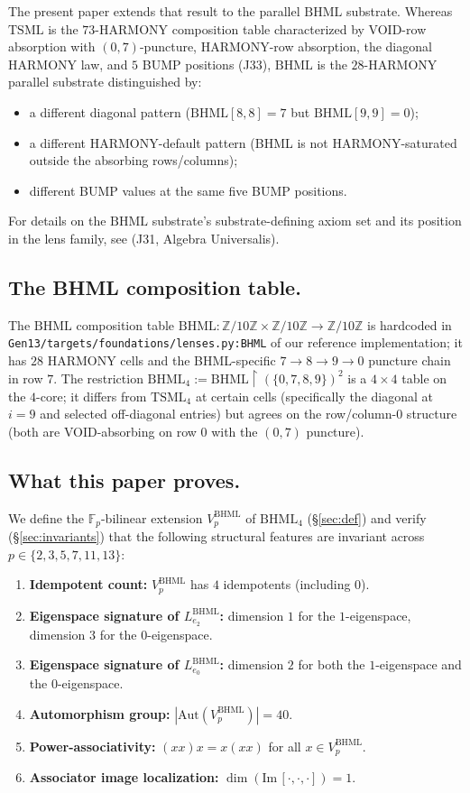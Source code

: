 \documentclass[11pt,reqno]{amsart}
\theoremstyle{plain}
\theoremstyle{definition}
\theoremstyle{remark}
\newcommand{\Z}{\mathbb{Z}}
\newcommand{\F}{\mathbb{F}}
\newcommand{\TSML}{\mathrm{TSML}}
\newcommand{\BHML}{\mathrm{BHML}}
\newcommand{\Aut}{\mathrm{Aut}}
\begin{document}
The present paper extends that result to the parallel $\BHML$
substrate. Whereas $\TSML$ is the $73$-HARMONY composition table
characterized by VOID-row absorption with $(0,7)$-puncture,
HARMONY-row absorption, the diagonal HARMONY law, and $5$ BUMP
positions \cite{SandersForcing} (J33), $\BHML$ is the $28$-HARMONY
parallel substrate distinguished by:
\begin{itemize}
\item a different diagonal pattern ($\BHML[8,8] = 7$ but
$\BHML[9,9] = 0$);
\item a different HARMONY-default pattern (BHML is not
HARMONY-saturated outside the absorbing rows/columns);
\item different BUMP values at the same five BUMP positions.
\end{itemize}
For details on the $\BHML$ substrate's substrate-defining axiom set
and its position in the lens family, see
\cite{SandersGishThreeSubstrate} (J31, Algebra Universalis).

\subsection{The BHML composition table.}
The $\BHML$ composition table $\BHML : \Z/10\Z \times \Z/10\Z \to
\Z/10\Z$ is hardcoded in
\texttt{Gen13/targets/foundations/lenses.py:BHML} of our reference
implementation; it has $28$ HARMONY cells and the BHML-specific
$7\to 8\to 9\to 0$ puncture chain in row $7$. The restriction
$\BHML_4 := \BHML \restriction (\{0, 7, 8, 9\})^2$ is a $4 \times 4$
table on the $4$-core; it differs from $\TSML_4$ at certain cells
(specifically the diagonal at $i = 9$ and selected off-diagonal
entries) but agrees on the row/column-$0$ structure (both are
VOID-absorbing on row 0 with the $(0,7)$ puncture).

\subsection{What this paper proves.}
We define the $\F_p$-bilinear extension $V_p^\BHML$ of $\BHML_4$
(\S\ref{sec:def}) and verify (\S\ref{sec:invariants}) that
the following structural features are invariant across
$p \in \{2, 3, 5, 7, 11, 13\}$:
\begin{enumerate}
\item \textbf{Idempotent count:} $V_p^\BHML$ has $4$ idempotents
(including $0$).
\item \textbf{Eigenspace signature of $L_{e_2}^\BHML$:} dimension
$1$ for the $1$-eigenspace, dimension $3$ for the $0$-eigenspace.
\item \textbf{Eigenspace signature of $L_{e_0}^\BHML$:} dimension
$2$ for both the $1$-eigenspace and the $0$-eigenspace.
\item \textbf{Automorphism group:} $|\Aut(V_p^\BHML)| = 40$.
\item \textbf{Power-associativity:} $(xx)x = x(xx)$ for all
$x \in V_p^\BHML$.
\item \textbf{Associator image localization:} $\dim(\mathrm{Im}\,
[\cdot,\cdot,\cdot]) = 1$.
\end{enumerate}
\end{document}
